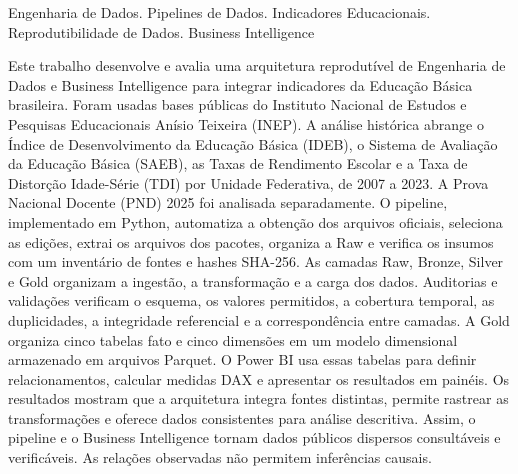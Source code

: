 \documentclass[tccgrad]{tccUEMG}
\begin{document}

\begin{resumo}{Engenharia de Dados. Pipelines de Dados. Indicadores Educacionais. Reprodutibilidade de Dados. Business Intelligence}

Este trabalho desenvolve e avalia uma arquitetura reprodutível de Engenharia de Dados e Business Intelligence para integrar indicadores da Educação Básica brasileira. Foram usadas bases públicas do Instituto Nacional de Estudos e Pesquisas Educacionais Anísio Teixeira (INEP). A análise histórica abrange o Índice de Desenvolvimento da Educação Básica (IDEB), o Sistema de Avaliação da Educação Básica (SAEB), as Taxas de Rendimento Escolar e a Taxa de Distorção Idade-Série (TDI) por Unidade Federativa, de 2007 a 2023. A Prova Nacional Docente (PND) 2025 foi analisada separadamente. O pipeline, implementado em Python, automatiza a obtenção dos arquivos oficiais, seleciona as edições, extrai os arquivos dos pacotes, organiza a Raw e verifica os insumos com um inventário de fontes e hashes SHA-256. As camadas Raw, Bronze, Silver e Gold organizam a ingestão, a transformação e a carga dos dados. Auditorias e validações verificam o esquema, os valores permitidos, a cobertura temporal, as duplicidades, a integridade referencial e a correspondência entre camadas. A Gold organiza cinco tabelas fato e cinco dimensões em um modelo dimensional armazenado em arquivos Parquet. O Power BI usa essas tabelas para definir relacionamentos, calcular medidas DAX e apresentar os resultados em painéis. Os resultados mostram que a arquitetura integra fontes distintas, permite rastrear as transformações e oferece dados consistentes para análise descritiva. Assim, o pipeline e o Business Intelligence tornam dados públicos dispersos consultáveis e verificáveis. As relações observadas não permitem inferências causais.

\end{resumo}
\end{document}
